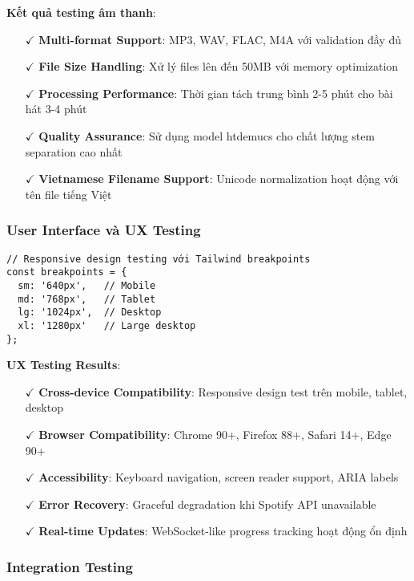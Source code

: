 \documentclass[12pt,a4paper]{article}
\begin{document}
\textbf{Kết quả testing âm thanh}:
\begin{itemize}
\item[$\checkmark$] \textbf{Multi-format Support}: MP3, WAV, FLAC, M4A với validation đầy đủ
\item[$\checkmark$] \textbf{File Size Handling}: Xử lý files lên đến 50MB với memory optimization
\item[$\checkmark$] \textbf{Processing Performance}: Thời gian tách trung bình 2-5 phút cho bài hát 3-4 phút
\item[$\checkmark$] \textbf{Quality Assurance}: Sử dụng model htdemucs cho chất lượng stem separation cao nhất
\item[$\checkmark$] \textbf{Vietnamese Filename Support}: Unicode normalization hoạt động với tên file tiếng Việt
\end{itemize}

\subsubsection{User Interface và UX Testing}

\begin{lstlisting}[caption={Responsive design testing với Tailwind breakpoints}]
// Responsive design testing với Tailwind breakpoints
const breakpoints = {
  sm: '640px',   // Mobile
  md: '768px',   // Tablet
  lg: '1024px',  // Desktop
  xl: '1280px'   // Large desktop
};
\end{lstlisting}

\textbf{UX Testing Results}:
\begin{itemize}
\item[$\checkmark$] \textbf{Cross-device Compatibility}: Responsive design test trên mobile, tablet, desktop
\item[$\checkmark$] \textbf{Browser Compatibility}: Chrome 90+, Firefox 88+, Safari 14+, Edge 90+
\item[$\checkmark$] \textbf{Accessibility}: Keyboard navigation, screen reader support, ARIA labels
\item[$\checkmark$] \textbf{Error Recovery}: Graceful degradation khi Spotify API unavailable
\item[$\checkmark$] \textbf{Real-time Updates}: WebSocket-like progress tracking hoạt động ổn định
\end{itemize}

\subsubsection{Integration Testing}
\end{document}
